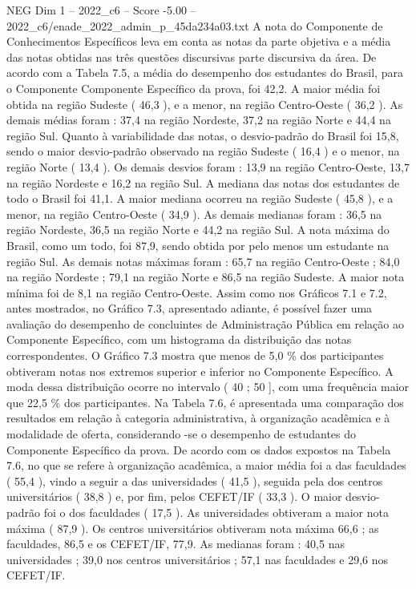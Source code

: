 \begin{textsample}{NEG Dim 1 – 2022\_c6 – Score -5.00 – 2022\_c6/enade\_2022\_admin\_p\_45da234a03.txt}
A nota do Componente de Conhecimentos Específicos leva em conta as notas da parte objetiva e a média das notas obtidas nas três questões discursivas parte discursiva da área.
De acordo com a Tabela 7.5, a média do desempenho dos estudantes do Brasil, para o Componente Componente Específico da prova, foi 42,2.
A maior média foi obtida na região Sudeste ( 46,3 ), e a menor, na região Centro-Oeste ( 36,2 ).
As demais médias foram : 37,4 na região Nordeste, 37,2 na região Norte e 44,4 na região Sul.
Quanto à variabilidade das notas, o desvio-padrão do Brasil foi 15,8, sendo o maior desvio-padrão observado na região Sudeste ( 16,4 ) e o menor, na região Norte ( 13,4 ).
Os demais desvios foram : 13,9 na região Centro-Oeste, 13,7 na região Nordeste e 16,2 na região Sul.
A mediana das notas dos estudantes de todo o Brasil foi 41,1.
A maior mediana ocorreu na região Sudeste ( 45,8 ), e a menor, na região Centro-Oeste ( 34,9 ).
As demais medianas foram : 36,5 na região Nordeste, 36,5 na região Norte e 44,2 na região Sul.
A nota máxima do Brasil, como um todo, foi 87,9, sendo obtida por pelo menos um estudante na região Sul.
As demais notas máximas foram : 65,7 na região Centro-Oeste ; 84,0 na região Nordeste ; 79,1 na região Norte e 86,5 na região Sudeste.
A maior nota mínima foi de 8,1 na região Centro-Oeste.
Assim como nos Gráficos 7.1 e 7.2, antes mostrados, no Gráfico 7.3, apresentado adiante, é possível fazer uma avaliação do desempenho de concluintes de Administração Pública em relação ao Componente Específico, com um histograma da distribuição das notas correspondentes.
O Gráfico 7.3 mostra que menos de 5,0 \% dos participantes obtiveram notas nos extremos superior e inferior no Componente Específico.
A moda dessa distribuição ocorre no intervalo ( 40 ; 50 ], com uma frequência maior que 22,5 \% dos participantes.
Na Tabela 7.6, é apresentada uma comparação dos resultados em relação à categoria administrativa, à organização acadêmica e à modalidade de oferta, considerando -se o desempenho de estudantes do Componente Específico da prova.
De acordo com os dados expostos na Tabela 7.6, no que se refere à organização acadêmica, a maior média foi a das faculdades ( 55,4 ), vindo a seguir a das universidades ( 41,5 ), seguida pela dos centros universitários ( 38,8 ) e, por fim, pelos CEFET/IF ( 33,3 ).
O maior desvio-padrão foi o dos faculdades ( 17,5 ).
As universidades obtiveram a maior nota máxima ( 87,9 ).
Os centros universitários obtiveram nota máxima 66,6 ; as faculdades, 86,5 e os CEFET/IF, 77,9.
As medianas foram : 40,5 nas universidades ; 39,0 nos centros universitários ; 57,1 nas faculdades e 29,6 nos CEFET/IF.

\end{textsample}
